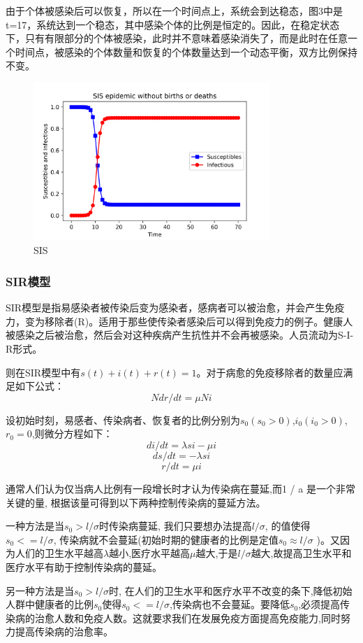 \documentclass[12pt]{report}
\begin{document}
   由于个体被感染后可以恢复，所以在一个时间点上，系统会到达稳态，图3中是t=17，系统达到一个稳态，其中感染个体的比例是恒定的。因此，在稳定状态下，只有有限部分的个体被感染，此时并不意味着感染消失了，而是此时在任意一个时间点，被感染的个体数量和恢复的个体数量达到一个动态平衡，双方比例保持不变。
	
	\begin{figure}
		\centering
		\includegraphics[width=0.8\textwidth]{img/SIS.png}
		\caption{SIS} 
		\label{img}
	\end{figure}
	\setcounter{secnumdepth}{3}\subsubsection{SIR模型}
	
	SIR模型是指易感染者被传染后变为感染者，感病者可以被治愈，并会产生免疫力，变为移除者(R)。适用于那些使传染者感染后可以得到免疫力的例子。健康人被感染之后被治愈，然后会对这种疾病产生抗性并不会再被感染。人员流动为S-I-R形式。
	\par\setlength\parindent{2em}则在SIR模型中有$s(t)+i(t)+r(t)=1$。对于病愈的免疫移除者的数量应满足如下公式：
	$$N dr/dt=\mu Ni$$
	
	设初始时刻，易感者、传染病者、恢复者的比例分别为$s_0 (s_0>0)$,$i_0 (i_0>0)$,$r_0=0$,则微分方程如下：
	$$di/dt=\lambda si-\mu i$$
	$$ds/dt=-\lambda si$$
	$$r/dt=\mu i$$

   通常人们认为仅当病人比例有一段增长时才认为传染病在蔓延,而1 / a 是一个非常关键的量, 根据该量可得到以下两种控制传染病的蔓延方法。
   \par\setlength\parindent{2em}一种方法是当$s_0>l/\sigma$时传染病蔓延, 我们只要想办法提高$l/\sigma$, 的值使得$s_0<=l/\sigma$, 传染病就不会蔓延(初始时期的健康者的比例是定值$s_0\approx l/\sigma$ )。又因为人们的卫生水平越高$\lambda$越小,医疗水平越高$\mu$越大,于是$l/\sigma$越大,故提高卫生水平和医疗水平有助于控制传染病的蔓延。
   \par\setlength\parindent{2em}另一种方法是当$s_0>l/\sigma$时, 在人们的卫生水平和医疗水平不改变的条下,降低初始人群中健康者的比例$s_0$使得$s_0<=l/\sigma$,传染病也不会蔓延。要降低$s_0$,必须提高传染病的治愈人数和免疫人数。这就要求我们在发展免疫方面提高免疫能力,同时努力提高传染病的治愈率。
		
\end{document}

